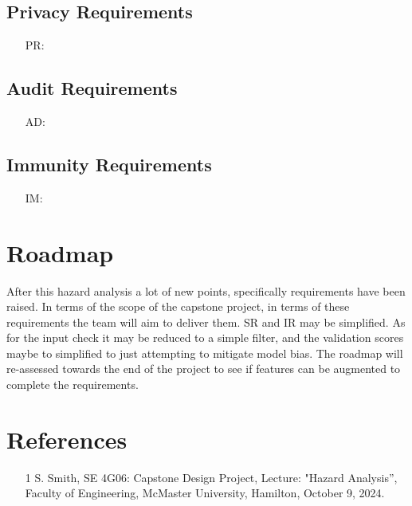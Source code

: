 \documentclass{article}
\newcounter{prnum} %
\newcounter{adnum} %
\newcounter{imnum} %
\begin{document}
\subsection{Privacy Requirements}
\begin{itemize}
    \item [PR\refstepcounter{prnum}\theprnum \label{PR_}:] 
\end{itemize}

\subsection{Audit Requirements}
\begin{itemize}
    \item [AD\refstepcounter{adnum}\theadnum \label{AD_}:] 
\end{itemize}

\subsection{Immunity Requirements}
\begin{itemize}
    \item [IM\refstepcounter{imnum}\theimnum \label{IM_}:] 
\end{itemize}

\section{Roadmap}


After this hazard analysis a lot of new points, specifically requirements have been raised. In terms of the scope of the capstone project, in terms of these requirements the team will aim to deliver them. SR\label{SR_InputCheck} and IR\label{IR_ValidationScore} may be simplified. As for the input check it may be reduced to a simple filter, and the validation scores maybe to simplified to just attempting to mitigate model bias. The roadmap will re-assessed towards the end of the project to see if features can be augmented to complete the requirements.
\newpage{}

\section{References}

\begin{itemize}
    \item [1] S. Smith, SE 4G06: Capstone Design Project, Lecture: "Hazard Analysis”, Faculty of Engineering, McMaster University, Hamilton, October 9, 2024.
\end{itemize}
\end{document}
